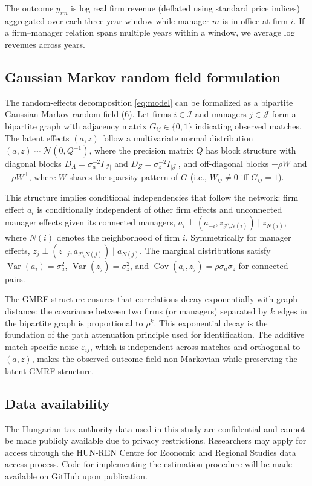 \documentclass[9pt,twocolumn,twoside]{pnas-new}
\begin{document}
{The outcome $y_{im}$ is log real firm revenue (deflated using standard price indices) aggregated over each three-year window while manager $m$ is in office at firm $i$. If a firm--manager relation spans multiple years within a window, we average log revenues across years.

\subsection*{Gaussian Markov random field formulation}

The random-effects decomposition \eqref{eq:model} can be formalized as a bipartite Gaussian Markov random field (6). Let firms $i \in \mathcal{I}$ and managers $j \in \mathcal{J}$ form a bipartite graph with adjacency matrix $G_{ij} \in \{0,1\}$ indicating observed matches. The latent effects $(a,z)$ follow a multivariate normal distribution $(a,z) \sim \mathcal{N}(0, Q^{-1})$, where the precision matrix $Q$ has block structure with diagonal blocks $D_A = \sigma_a^{-2} I_{|\mathcal{I}|}$ and $D_Z = \sigma_z^{-2} I_{|\mathcal{J}|}$, and off-diagonal blocks $-\rho W$ and $-\rho W^\top$, where $W$ shares the sparsity pattern of $G$ (i.e., $W_{ij}\neq 0$ iff $G_{ij}=1$).

This structure implies conditional independencies that follow the network: firm effect $a_i$ is conditionally independent of other firm effects and unconnected manager effects given its connected managers, $a_i \perp (a_{-i}, z_{\mathcal{J}\setminus N(i)}) \mid z_{N(i)}$, where $N(i)$ denotes the neighborhood of firm $i$. Symmetrically for manager effects, $z_j \perp (z_{-j}, a_{\mathcal{I}\setminus N(j)}) \mid a_{N(j)}$. The marginal distributions satisfy $\operatorname{Var}(a_i)=\sigma_a^2$, $\operatorname{Var}(z_j)=\sigma_z^2$, and $\operatorname{Cov}(a_i,z_j)=\rho\sigma_a\sigma_z$ for connected pairs.

The GMRF structure ensures that correlations decay exponentially with graph distance: the covariance between two firms (or managers) separated by $k$ edges in the bipartite graph is proportional to $\rho^k$. This exponential decay is the foundation of the path attenuation principle used for identification. The additive match-specific noise $\varepsilon_{ij}$, which is independent across matches and orthogonal to $(a,z)$, makes the observed outcome field non-Markovian while preserving the latent GMRF structure.


\subsection*{Data availability}

The Hungarian tax authority data used in this study are confidential and cannot be made publicly available due to privacy restrictions. Researchers may apply for access through the HUN-REN Centre for Economic and Regional Studies data access process. Code for implementing the estimation procedure will be made available on GitHub upon publication.

}
\end{document}
